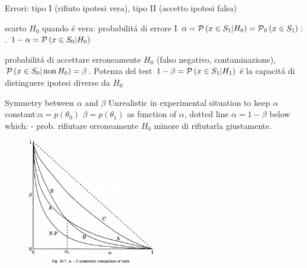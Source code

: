 \documentclass[asd-beamer.tex]{subfiles}%
\begin{document}
\begin{frame}{Errori: tipo I (rifiuto ipotesi vera), tipo II (accetto ipotesi falsa)}
\begin{block}{ }
	scarto $H_0$ quando \'e vera: probabilit\'a di errore I $\alpha=\operatorname{\mathcal{P}}{(x\in S_1|H_0)}=\operatorname{\mathcal{P}}_0{(x\in S_1)}$: .  $1-\alpha=\operatorname{\mathcal{P}}{(x\in S_0|H_0)}$
\end{block}
\begin{block}{}
	probabilit\'a di accettare erroneamente $H_0$ (falso negativo, contaminazione), $\operatorname{\mathcal{P}}{(x\in S_0|\operatorname{non}{H_0})}=\beta$. Potenza del test $1-\beta=\operatorname{\mathcal{P}}{(x\in S_1|H_1)}$ \'e la capacit\'a di distinguere ipotesi diverse da $H_0$ 
\end{block}
\end{frame}

\begin{frame}{Symmetry between $\alpha$ and $\beta$}
Unrealistic in experimental situation to keep $\alpha$ constant:$\alpha=p(\theta_0)$ $\beta=p(\theta_1)$ as function of $\alpha$, dotted line $\alpha=1-\beta$ below which:  - prob. rifiutare erroneamente $H_0$ minore di rifiutarla giustamente.
\begin{figure}[!ht]\includegraphics[trim={0cm 0cm 0 0},clip, keepaspectratio,width=0.5\textwidth]{figures/james/test/testabsym}\label{fig:testabsym}\end{figure}
\end{frame}
\end{document}
